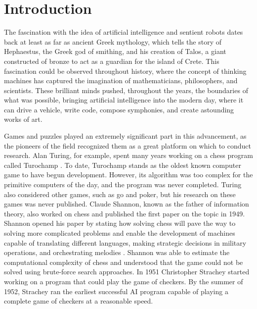 \chapter{Introduction}

The fascination with the idea of artificial intelligence and sentient robots dates back at least as far as ancient Greek mythology, which tells the story of Hephaestus, the Greek god of smithing, and his creation of Talos, a giant constructed of bronze to act as a guardian for the island of Crete.
This fascination could be observed throughout history, where the concept of thinking machines has captured the imagination of mathematicians, philosophers, and scientists. These brilliant minds pushed, throughout the years, the boundaries of what was possible, bringing artificial intelligence into the modern day, where it can drive a vehicle, write code, compose symphonies, and create astounding works of art.

Games and puzzles played an extremely significant part in this advancement, as the pioneers of the field recognized them as a great platform on which to conduct research. Alan Turing, for example, spent many years working on a chess program called Turochamp \cite{turing1953digital}. To date, Turochamp stands as the oldest known computer game to have begun development. However, its algorithm was too complex for the primitive computers of the day, and the program was never completed. Turing also considered other games, such as go and poker, but his research on these games was never published. Claude Shannon, known as the father of information theory, also worked on chess and published the first paper on the topic in 1949. Shannon opened his paper by stating how solving chess will pave the way to solving more complicated problems and enable the development of machines capable of translating different languages, making strategic decisions in military operations, and orchestrating melodies \cite{shannon1950chess}. Shannon was able to estimate the computational complexity of chess and understood that the game could not be solved using brute-force search approaches. In 1951 Christopher Strachey started working on a program that could play the game of checkers. By the summer of 1952, Strachey ran the earliest successful AI program capable of playing a complete game of checkers at a reasonable speed. 

